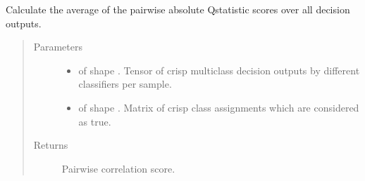 \documentclass[letterpaper,10pt,english]{sphinxmanual}
\begin{document}
\begin{fulllineitems}
\label{\detokenize{pusion.evaluation.evaluation_metrics:pusion.evaluation.evaluation_metrics.pairwise_q_statistic}}
\sphinxAtStartPar
Calculate the average of the pairwise absolute Q\sphinxhyphen{}statistic scores over all decision outputs.
\begin{quote}\begin{description}
\item[{Parameters}] \leavevmode\begin{itemize}
\item {} 
\sphinxAtStartPar
{} \textendash{}  of shape .
Tensor of crisp multiclass decision outputs by different classifiers per sample.

\item {} 
\sphinxAtStartPar
{} \textendash{}  of shape .
Matrix of crisp class assignments which are considered as true.

\end{itemize}

\item[{Returns}] \leavevmode
\sphinxAtStartPar
Pairwise correlation score.

\end{description}\end{quote}

\end{fulllineitems}

\end{document}
